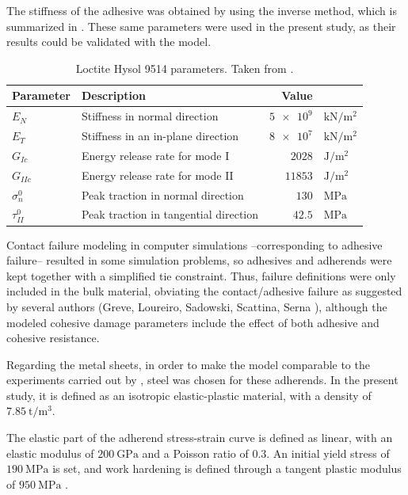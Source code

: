 \documentclass[cmfonts]{witpress}
\begin{document}
The stiffness of the adhesive was obtained by \cite{Scattina2011} using the inverse method, which is summarized in . These same parameters were used in the present study, as their results could be validated with the model.
\begin{table}
	\centering
	\begin{tabular}{llrl}
	\hline
		Parameter & Description & Value & \\
		\hline
		$E_{N}$ & Stiffness in normal direction & $\num{5e9}$ & $\si{\kN/\m^2}$ \\
		$E_{T}$ & Stiffness in an in-plane direction & $\num{8e7}$ & $\si{\kN/\m^2}$ \\
		$G_{Ic}$ & Energy release rate for mode I & $\num{2028}$ & $\si{\J/\m^2}$ \\
		$G_{IIc}$ & Energy release rate for mode II & $\num{11853}$ & $\si{\J/\m^2}$ \\
		$\sigma_{n}^{0}$ & Peak traction in normal direction & $\num{130}$ & $\si{\MPa}$ \\
		$\tau_{II}^{0}$ & Peak traction in tangential direction & $\num{42.5}$ & $\si{\MPa}$ \\
		\hline
	\end{tabular}
	\caption[Loctite Hysol 9514 parameters.]{Loctite Hysol 9514 parameters. Taken from \cite{Scattina2011}.}
	\label{tab:ads_params}
\end{table}

Contact failure modeling in computer simulations --corresponding to adhesive failure-- resulted in some simulation problems, so adhesives and adherends were kept together with a simplified tie constraint. Thus, failure definitions were only included in the bulk material, obviating the contact/adhesive failure as suggested by several authors (Greve, Loureiro, Sadowski, Scattina, Serna \cite{Greve2007, Loureiro2010, Sadowski2010, Sadowski2011, Scattina2011, Sadowski2014, SernaMoreno2015}), although the modeled cohesive damage parameters include the effect of both adhesive and cohesive resistance.

Regarding the metal sheets, in order to make the model comparable to the experiments carried out by \cite{Peroni2009}, steel was chosen for these adherends. In the present study, it is defined as an isotropic elastic-plastic material, with a density of $\SI{7.85}{\tonne/\m^3}$.

The elastic part of the adherend stress-strain curve is defined as linear, with an elastic modulus of $\SI{200}{\GPa}$ and a Poisson ratio of $\num{0.3}$. An initial yield stress of $\SI{190}{\MPa}$ is set, and work hardening is defined through a tangent plastic modulus of $\SI{950}{\MPa}$ \cite{Peroni2009}.
\end{document}
